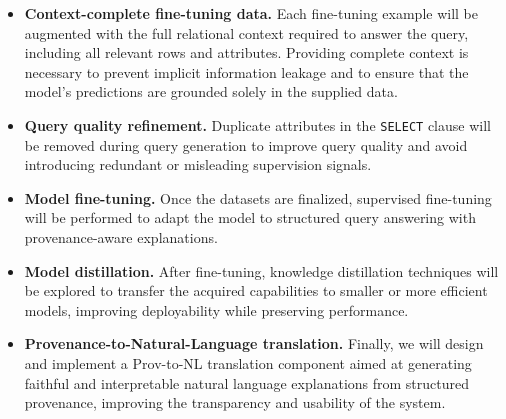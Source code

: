 \documentclass{article}
\begin{document}
\begin{itemize}
    \item \textbf{Context-complete fine-tuning data.}  
    Each fine-tuning example will be augmented with the full relational context required to answer the query, including all relevant rows and attributes. Providing complete context is necessary to prevent implicit information leakage and to ensure that the model’s predictions are grounded solely in the supplied data.

    \item \textbf{Query quality refinement.}  
    Duplicate attributes in the \texttt{SELECT} clause will be removed during query generation to improve query quality and avoid introducing redundant or misleading supervision signals.

    \item \textbf{Model fine-tuning.}  
    Once the datasets are finalized, supervised fine-tuning will be performed to adapt the model to structured query answering with provenance-aware explanations.

    \item \textbf{Model distillation.}  
    After fine-tuning, knowledge distillation techniques will be explored to transfer the acquired capabilities to smaller or more efficient models, improving deployability while preserving performance.

    \item \textbf{Provenance-to-Natural-Language translation.}  
    Finally, we will design and implement a Prov-to-NL translation component aimed at generating faithful and interpretable natural language explanations from structured provenance, improving the transparency and usability of the system.
\end{itemize}
\end{document}
